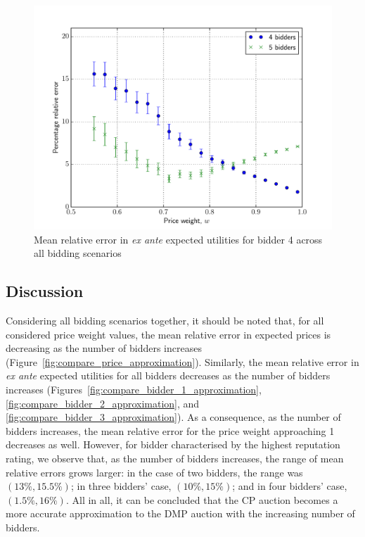\begin{figure}[t!]
  \includegraphics[width=\figsize]{Approximation/Figures/compare_bidder_4}
  \caption{Mean relative error in \emph{ex ante} expected utilities for bidder 4 across all bidding scenarios}
  \label{fig:compare_bidder_4_approximation}
\end{figure}

\subsection{Discussion} %
\label{sub:discussion_approximation}
Considering all bidding scenarios together, it should be noted that, for all considered price weight values, the mean relative error in expected prices is decreasing as the number of bidders increases (Figure~\ref{fig:compare_price_approximation}). Similarly, the mean relative error in \emph{ex ante} expected utilities for all bidders decreases as the number of bidders increases (Figures~\ref{fig:compare_bidder_1_approximation}, \ref{fig:compare_bidder_2_approximation}, and \ref{fig:compare_bidder_3_approximation}). As a consequence, as the number of bidders increases, the mean relative error for the price weight approaching 1 decreases as well. However, for bidder characterised by the highest reputation rating, we observe that, as the number of bidders increases, the range of mean relative errors grows larger: in the case of two bidders, the range was $(13\%, 15.5\%)$; in three bidders' case, $(10\%, 15\%)$; and in four bidders' case, $(1.5\%, 16\%)$. All in all, it can be concluded that the CP auction becomes a more accurate approximation to the DMP auction with the increasing number of bidders.


